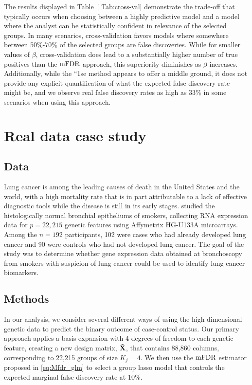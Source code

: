 The results displayed in Table~\ref{ Tab:cross-val} demonstrate the trade-off that typically occurs when choosing between a highly predictive model and a model where the analyst can be statistically confident in relevance of the selected groups. In many scenarios, cross-validation favors models where somewhere between 50\%-70\% of the selected groups are false discoveries. While for smaller values of $\beta$, cross-validation does lead to a substantially higher number of true positives than the $\textrm{mFDR}$ approach, this superiority diminishes as $\beta$ increases. Additionally, while the ``1se method appears to offer a middle ground, it does not provide any explicit quantification of what the expected false discovery rate might be, and we observe real false discovery rates as high as 33\% in some scenarios when using this approach.

\section{Real data case study}

\subsection{Data}

Lung cancer is among the leading causes of death in the United States and the world, with a high mortality rate that is in part attributable to a lack of effective diagnostic tools while the disease is still in its early stages. \citet{Spira2007} studied the histologically normal bronchial epitheliums of smokers, collecting RNA expression data for $p = 22,215$ genetic features using Affymetrix HG-U133A microarrays. Among the $n = 192$ participants, 102 were cases who had already developed lung cancer and 90 were controls who had not developed lung cancer. The goal of the study was to determine whether gene expression data obtained at bronchoscopy from smokers with suspicion of lung cancer could be used to identify lung cancer biomarkers.

\subsection{Methods}

In our analysis, we consider several different ways of using the high-dimensional genetic data to predict the binary outcome of case-control status. Our primary approach applies a basis expansion with 4 degrees of freedom to each genetic feature, creating a new design matrix, $\tilde{\mathbf{X}}$, that contains 88,860 columns, corresponding to 22,215 groups of size $K_j = 4$. We then use the $\textrm{mFDR}$ estimator proposed in \ref{eq:Mfdr_glm} to select a group lasso model that controls the expected marginal false discovery rate at 10\%. 

